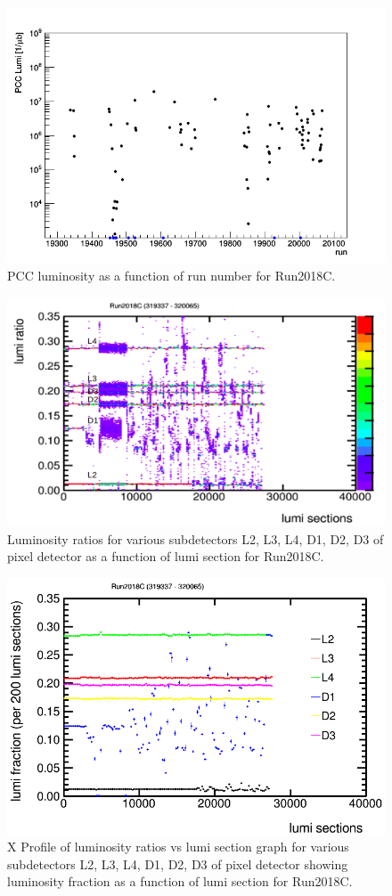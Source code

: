 \begin{figure}[H]
  \centering
  \includegraphics[width=0.5\columnwidth]{./runs_2018C.png}
  \caption{PCC luminosity as a function of run number for Run2018C.}
  \label{fig:CMS}
\end{figure}


\begin{figure}[H]
  \centering
  \includegraphics[width=0.5\columnwidth]{./2018C_lumiratio.png}
  \caption{Luminosity ratios for various subdetectors L2, L3, L4, D1, D2, D3 of pixel detector as a function of lumi section for Run2018C.}
  \label{fig:CMS}
\end{figure}


\begin{figure}[H]
  \centering
  \includegraphics[width=0.5\columnwidth]{./ProfileXcombinedC_new.png}
  \caption{X Profile of luminosity ratios vs lumi section graph for various subdetectors L2, L3, L4, D1, D2, D3 of pixel detector showing luminosity fraction as a function of lumi section for Run2018C. \cite{lumidpg}}
  \label{fig:CMS}
\end{figure}

